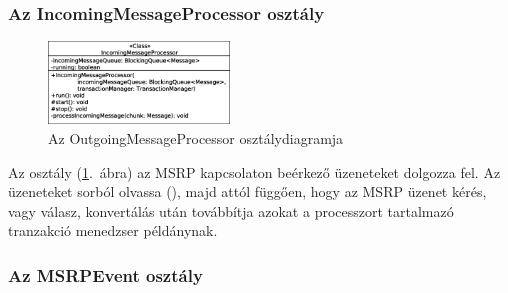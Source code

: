 \subsubsection*{Az IncomingMessageProcessor osztály}
\label{sec:msrp_incomingprocessor}
\begin{figure}
  \vspace{-15pt}
  \begin{center}
    \includegraphics[width=0.43\textwidth]{img/class_diagrams/IncomingMessageProcessor.eps}
  \end{center}
  \vspace{-15pt}
  \captionsetup{font=scriptsize}
  \caption{Az OutgoingMessageProcessor osztálydiagramja}
   \label{fig:class_incomingprocessor}
  \vspace{-10pt}
\end{figure}
Az  osztály (\ref{fig:class_incomingprocessor}.~ábra) az MSRP kapcsolaton beérkező üzeneteket dolgozza fel. Az üzeneteket sorból olvassa (), majd attól függően, hogy az MSRP üzenet kérés, vagy válasz, konvertálás után továbbítja azokat a processzort tartalmazó tranzakció menedzser példánynak. 

\subsubsection*{Az MSRPEvent osztály}
\label{sec:msrp_event}

